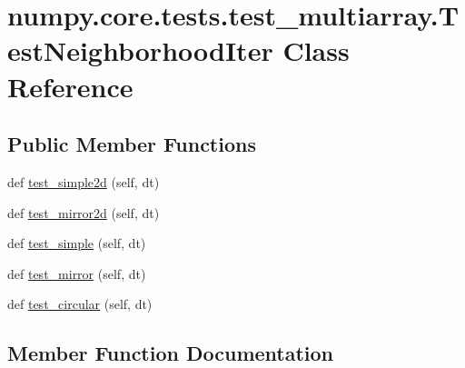 \hypertarget{classnumpy_1_1core_1_1tests_1_1test__multiarray_1_1TestNeighborhoodIter}{}\section{numpy.\+core.\+tests.\+test\+\_\+multiarray.\+Test\+Neighborhood\+Iter Class Reference}
\label{classnumpy_1_1core_1_1tests_1_1test__multiarray_1_1TestNeighborhoodIter}
\subsection*{Public Member Functions}
\begin{DoxyCompactItemize}
\item 
def \hyperlink{classnumpy_1_1core_1_1tests_1_1test__multiarray_1_1TestNeighborhoodIter_ac4a37e6355be84e63cfde980f30a5c0e}{test\+\_\+simple2d} (self, dt)
\item 
def \hyperlink{classnumpy_1_1core_1_1tests_1_1test__multiarray_1_1TestNeighborhoodIter_a32c64eca00bff15d39beccbe07f6004c}{test\+\_\+mirror2d} (self, dt)
\item 
def \hyperlink{classnumpy_1_1core_1_1tests_1_1test__multiarray_1_1TestNeighborhoodIter_adefc14ae31373310dfa5391c2d4d1558}{test\+\_\+simple} (self, dt)
\item 
def \hyperlink{classnumpy_1_1core_1_1tests_1_1test__multiarray_1_1TestNeighborhoodIter_a2327efd2e988bf03580f0281b0df49dc}{test\+\_\+mirror} (self, dt)
\item 
def \hyperlink{classnumpy_1_1core_1_1tests_1_1test__multiarray_1_1TestNeighborhoodIter_a13ef7fce7f1fbf958eecc11179c259a8}{test\+\_\+circular} (self, dt)
\end{DoxyCompactItemize}


\subsection{Member Function Documentation}
\mbox{\label{classnumpy_1_1core_1_1tests_1_1test__multiarray_1_1TestNeighborhoodIter_a13ef7fce7f1fbf958eecc11179c259a8}} 
